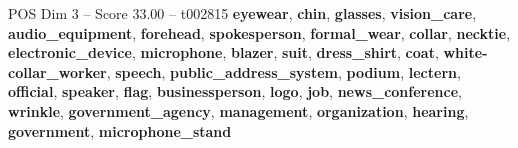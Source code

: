 \begin{textsample}{POS Dim 3 – Score 33.00 – t002815}  \label{ex:f3_pos_002}
\textbf{eyewear}, \textbf{chin}, \textbf{glasses}, \textbf{vision\_care}, \textbf{audio\_equipment}, \textbf{forehead}, \textbf{spokesperson}, \textbf{formal\_wear}, \textbf{collar}, \textbf{necktie}, \textbf{electronic\_device}, \textbf{microphone}, \textbf{blazer}, \textbf{suit}, \textbf{dress\_shirt}, \textbf{coat}, \textbf{white-collar\_worker}, \textbf{speech}, \textbf{public\_address\_system}, \textbf{podium}, \textbf{lectern}, \textbf{official}, \textbf{speaker}, \textbf{flag}, \textbf{businessperson}, \textbf{logo}, \textbf{job}, \textbf{news\_conference}, \textbf{wrinkle}, \textbf{government\_agency}, \textbf{management}, \textbf{organization}, \textbf{hearing}, \textbf{government}, \textbf{microphone\_stand}

\end{textsample}
